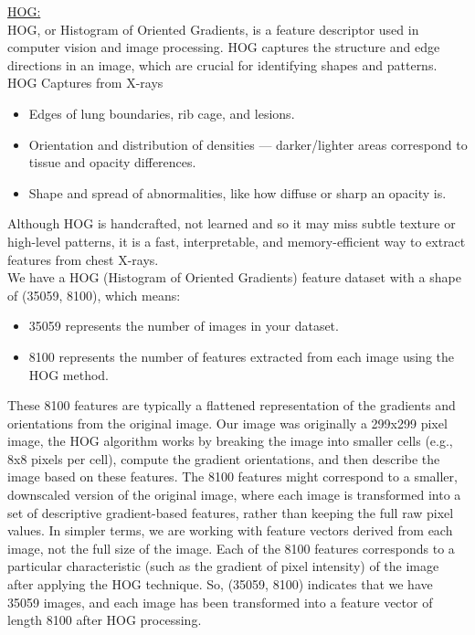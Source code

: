 \documentclass{article}
\begin{document}
\noindent \underline{HOG:}
\vspace{0.5cm}\\
HOG, or Histogram of Oriented Gradients, is a feature descriptor used in computer vision and image processing.  
HOG captures the structure and edge directions in an image, which are crucial for identifying shapes and patterns.
\\

HOG Captures from X-rays

\begin{itemize}
     \item Edges of lung boundaries, rib cage, and lesions.
     \item Orientation and distribution of densities — darker/lighter areas correspond to tissue and opacity differences.
     \item Shape and spread of abnormalities, like how diffuse or sharp an opacity is.
\end{itemize}
Although HOG is handcrafted, not learned  and  so it may miss subtle texture or high-level patterns, it is a fast, interpretable, and memory-efficient way to 
extract features from chest X-rays. \\
We have a HOG (Histogram of Oriented Gradients) feature dataset with a shape of (35059, 8100), which means:
\begin{itemize}
    \item 35059 represents the number of images in your dataset.
    \item 8100 represents the number of features extracted from each image using the HOG method.
\end{itemize}
	
These 8100 features are typically a flattened representation of the gradients and orientations from the original image. Our image was originally a 299x299 
pixel image, the HOG algorithm works by breaking the image into smaller cells (e.g., 8x8 pixels per cell), compute the gradient orientations, 
and then describe the image based on these features. The 8100 features might correspond to a smaller, downscaled version of the original image, where each image
is transformed into a set of descriptive gradient-based features, rather than keeping the full raw pixel values.
In simpler terms, we are working with feature vectors derived from each image, not the full size of the image. Each of the 8100 features corresponds to a 
particular characteristic (such as the gradient of pixel intensity) of the image after applying the HOG technique.
So, (35059, 8100) indicates that we have 35059 images, and each image has been transformed into a feature vector of length 8100 after HOG processing.
\end{document}
